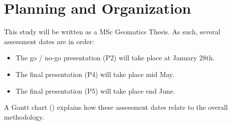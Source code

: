 \newpage
\section{Planning and Organization}

This study will be written as a MSc Geomatics Thesis. As such, several assessment dates are in order:   

\begin{itemize}
    \item The go / no-go presentation (P2) will take place at January 28th. 
    \item The final presentation (P4) will take place mid May.
    \item The final presentation (P5) will take place end June.
\end{itemize}

A Gantt chart () explains how these assessment dates relate to the overall methodology.




